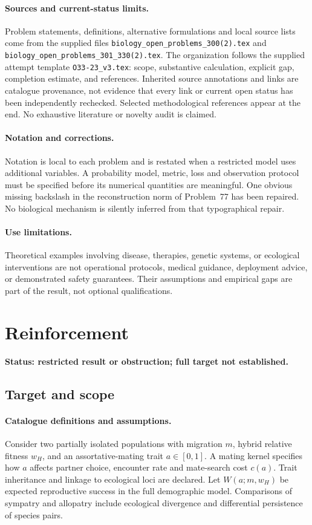 \documentclass[11pt]{article}
\begin{document}
\paragraph{Sources and current-status limits.}
Problem statements, definitions, alternative formulations and local source lists
come from the supplied files
\texttt{biology\_open\_problems\_300(2).tex} and
\texttt{biology\_open\_problems\_301\_330(2).tex}.
The organization follows the supplied attempt template
\texttt{O33-23\_v3.tex}: scope, substantive calculation, explicit gap,
completion estimate, and references. Inherited source annotations and links are
catalogue provenance, not evidence that every link or current open status has
been independently rechecked. Selected methodological references appear at the
end. No exhaustive literature or novelty audit is claimed.

\paragraph{Notation and corrections.}
Notation is local to each problem and is restated when a restricted model uses
additional variables. A probability model, metric, loss and observation protocol
must be specified before its numerical quantities are meaningful. One obvious
missing backslash in the reconstruction norm of Problem~77 has been repaired.
No biological mechanism is silently inferred from that typographical repair.

\paragraph{Use limitations.}
Theoretical examples involving disease, therapies, genetic systems, or ecological
interventions are not operational protocols, medical guidance, deployment advice,
or demonstrated safety guarantees. Their assumptions and empirical gaps are part
of the result, not optional qualifications.


\section*{Reinforcement}
\label{prob:148}
\noindent\textbf{Status: restricted result or obstruction; full target not established.}
\subsection{Target and scope}
\paragraph{Catalogue definitions and assumptions.}
Consider two partially isolated populations with migration $m$, hybrid relative fitness $w_H$, and an assortative-mating trait $a\in[0,1]$. A mating kernel specifies how $a$ affects partner choice, encounter rate and mate-search cost $c(a)$. Trait inheritance and linkage to ecological loci are declared. Let $W(a;m,w_H)$ be expected reproductive success in the full demographic model. Comparisons of sympatry and allopatry include ecological divergence and differential persistence of species pairs.
\end{document}
